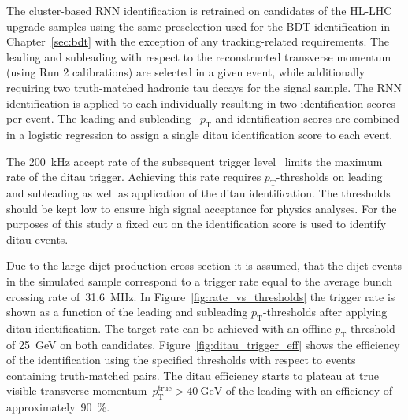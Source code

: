 The cluster-based RNN identification is retrained on \tauhadvis candidates of
the HL-LHC upgrade samples using the same preselection used for the BDT
identification in Chapter~\ref{sec:bdt} with the exception of any
tracking-related requirements. The leading and subleading \tauhadvis with
respect to the reconstructed transverse momentum (using Run 2 calibrations) are
selected in a given event, while additionally requiring two truth-matched
hadronic tau decays for the signal sample. The RNN identification is applied to
each \tauhadvis individually resulting in two identification scores per event.
The leading and subleading \tauhadvis~$p_\text{T}$ and identification scores are
combined in a logistic regression to assign a single ditau identification score
to each event.

The \SI{200}{\kilo\hertz} accept rate of the subsequent trigger
level~\cite{phase_2_scoping} limits the maximum rate of the ditau trigger.
Achieving this rate requires $p_\text{T}$-thresholds on leading and subleading
\tauhadvis as well as application of the ditau identification. The thresholds
should be kept low to ensure high signal acceptance for physics analyses. For
the purposes of this study a fixed cut on the identification score  is used to identify ditau events.

Due to the large dijet production cross section it is assumed, that the dijet
events in the simulated sample correspond to a trigger rate equal to the average
bunch crossing rate of~\SI{31.6}{\mega\hertz}. In
Figure~\ref{fig:rate_vs_thresholds} the trigger rate is shown as a function of
the leading and subleading \tauhadvis $p_\text{T}$-thresholds after applying
ditau identification. The target rate can be achieved with an offline
$p_\text{T}$-threshold of \SI{25}{\GeV} on both \tauhadvis candidates.
Figure~\ref{fig:ditau_trigger_eff} shows the efficiency of the identification
using the specified thresholds with respect to events containing truth-matched
\tauhadvis pairs. The ditau efficiency starts to plateau at true visible
transverse momentum~$p_\text{T}^\text{true} > \SI{40}{\GeV}$ of the leading
\tauhadvis with an efficiency of approximately~\SI{90}{\percent}.

